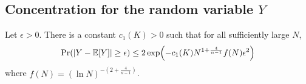 

\subsection{Concentration for the random variable $Y$}

\begin{lemma}\label{YpropK}
	Let $\epsilon>0$. There is a constant $c_1(K)>0$ such that for all sufficiently large $N$,
	\[
	\Pr(|Y-\E[Y]| \geq \epsilon) \leq
	2\exp\left(-c_1(K)N^{1+\frac{4}{n-1}}f(N)\epsilon^2\right)
	\]
	where $f(N)=(\ln N)^{-(2+\frac{4}{n-1})}$.
\end{lemma}

